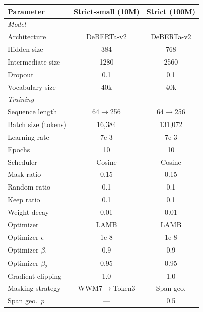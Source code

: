 \documentclass[11pt]{article}
\begin{document}
\begin{center}
\centering
\small
\setlength{\tabcolsep}{4pt}
\begin{tabular}{lcc}
\toprule
\textbf{Parameter} & \textbf{Strict-small (10M)} & \textbf{Strict (100M)} \\
\midrule
\multicolumn{3}{l}{\emph{Model}} \\
Architecture        & DeBERTa-v2 & DeBERTa-v2 \\
Hidden size         & 384        & 768 \\
Intermediate size   & 1280       & 2560 \\
Dropout             & 0.1        & 0.1 \\
Vocabulary size     & 40k        & 40k \\
\midrule
\multicolumn{3}{l}{\emph{Training}} \\
Sequence length     & 64$\to$256 & 64$\to$256 \\
Batch size (tokens) & 16{,}384   & 131{,}072 \\
Learning rate       & 7e-3       & 7e-3 \\
Epochs              & 10         & 10 \\
Scheduler           & Cosine     & Cosine \\
Mask ratio          & 0.15       & 0.15 \\
Random ratio        & 0.1        & 0.1 \\
Keep ratio          & 0.1        & 0.1 \\
Weight decay        & 0.01       & 0.01 \\
Optimizer           & LAMB       & LAMB \\
Optimizer $\epsilon$& 1e-8       & 1e-8 \\
Optimizer $\beta_1$ & 0.9        & 0.9 \\
Optimizer $\beta_2$ & 0.95       & 0.95 \\
Gradient clipping   & 1.0        & 1.0 \\
Masking strategy    & WWM7$\to$Token3 & Span geo. \\
Span geo.\ $p$      & ---        & 0.5 \\
\bottomrule
\end{tabular}
\label{tab:hyperparams}
\end{center}
\end{document}
